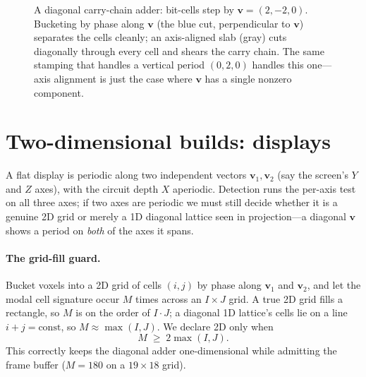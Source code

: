 \documentclass[11pt]{article}
\newcommand{\vv}{\mathbf{v}}
\begin{document}
\begin{figure}[ht]
\centering
{}
\caption{A diagonal carry-chain adder: bit-cells step by $\vv=(2,-2,0)$. Bucketing
by phase along $\vv$ (the blue cut, perpendicular to $\vv$) separates the cells
cleanly; an axis-aligned slab (gray) cuts diagonally through every cell and
shears the carry chain. The same stamping that handles a vertical period
$(0,2,0)$ handles this one---axis alignment is just the case where $\vv$ has a
single nonzero component.}
\label{fig:diagonal}
\end{figure}

\section{Two-dimensional builds: displays}\label{sec:2d}

A flat display is periodic along two independent vectors $\vv_1,\vv_2$ (say the
screen's $Y$ and $Z$ axes), with the circuit depth $X$ aperiodic. Detection runs
the per-axis test on all three axes; if two axes are periodic we must still
decide whether it is a genuine 2D grid or merely a 1D diagonal lattice seen in
projection---a diagonal $\vv$ shows a period on \emph{both} of the axes it spans.

\paragraph{The grid-fill guard.} Bucket voxels into a 2D grid of cells
$(i,j)$ by phase along $\vv_1$ and $\vv_2$, and let the modal cell signature occur
$M$ times across an $I\times J$ grid. A true 2D grid fills a rectangle, so
$M$ is on the order of $I\cdot J$; a diagonal 1D lattice's cells lie on a line
$i+j=\text{const}$, so $M\approx\max(I,J)$. We declare 2D only when
\[
M \;\ge\; 2\max(I,J).
\]
This correctly keeps the diagonal adder one-dimensional while admitting the
frame buffer ($M=180$ on a $19\times18$ grid).
\end{document}
